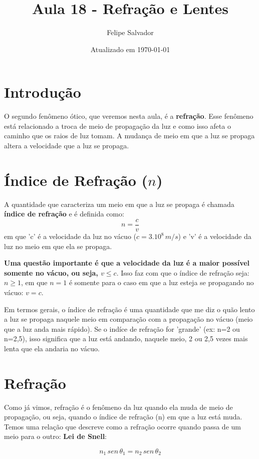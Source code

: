 \documentclass[12pt]{extarticle}
\title{Aula 18 - Refração e Lentes}
\author{Felipe Salvador}
\date{Atualizado em \today}
\newcommand{\<}{\langle}
\renewcommand{\>}{\rangle}
\theoremstyle{definition}
\begin{document}
\maketitle

\section{Introdução}

O segundo fenômeno ótico, que veremos nesta aula, é a \textbf{refração}. Esse fenômeno está relacionado a troca de meio de propagação da luz e como isso afeta o caminho que os raios de luz tomam. A mudança de meio em que a luz se propaga altera a velocidade que a luz se propaga.
\section{Índice de Refração ($n$)}
A quantidade que caracteriza um meio em que a luz se propaga é chamada \textbf{índice de refração} e é definida como:
\begin{equation}
    n = \frac{c}{v}
\end{equation}
\noindent em que 'c' é a velocidade da luz no vácuo ($c=3.10^8\,m/s$) e 'v' é a velocidade da luz no meio em que ela se propaga.

\textbf{Uma questão importante é que a velocidade da luz é a maior possível somente no vácuo, ou seja, $v\leq c$}. Isso faz com que o índice de refração seja: $n\geq 1$, em que $n=1$ é somente para o caso em que a luz esteja se propagando no vácuo: $v=c$.

Em termos gerais, o índice de refração é uma quantidade que me diz o quão lento a luz se propaga naquele meio em comparação com a propagação no vácuo (meio que a luz anda mais rápido). Se o indíce de refração for 'grande' (ex: n=2 ou n=2,5), isso significa que a luz está andando, naquele meio, 2 ou 2,5 vezes mais lenta que ela andaria no vácuo. 

\section{Refração}
Como já vimos, refração é o fenômeno da luz quando ela muda de meio de propagação, ou seja, quando o índice de refração (n) em que a luz está muda. Temos uma relação que descreve como a refração ocorre quando passa de um meio para o outro: \textbf{Lei de Snell}:

\begin{equation}
    n_1\,sen\,\theta_1 = n_2\,sen\,\theta_2
\end{equation}
\end{document}

